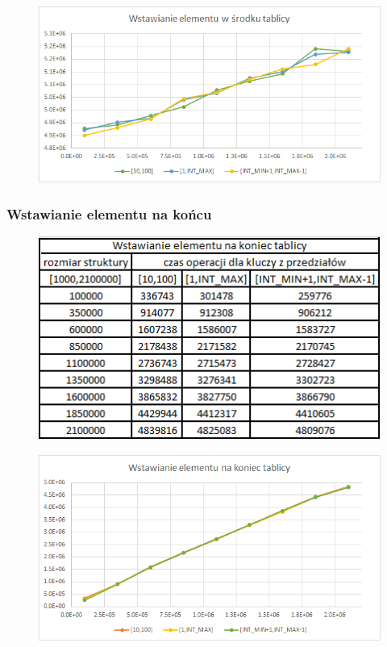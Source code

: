 \documentclass{article}
\begin{document}
\begin{figure}[h!]
    \centering
    \includegraphics[width=11.3cm]{images/wstawianie_srodek_tab.png}
\end{figure}

\newpage

\subsubsection*{Wstawianie elementu na końcu}

\begin{figure}[h!]
    \centering
    \includegraphics{images/TAB_KONIEC.png}
\end{figure}

\begin{figure}[h!]
    \centering
    \includegraphics[width=11.3cm]{images/wstawianie_koniec_tab.png}
\end{figure}
\end{document}
